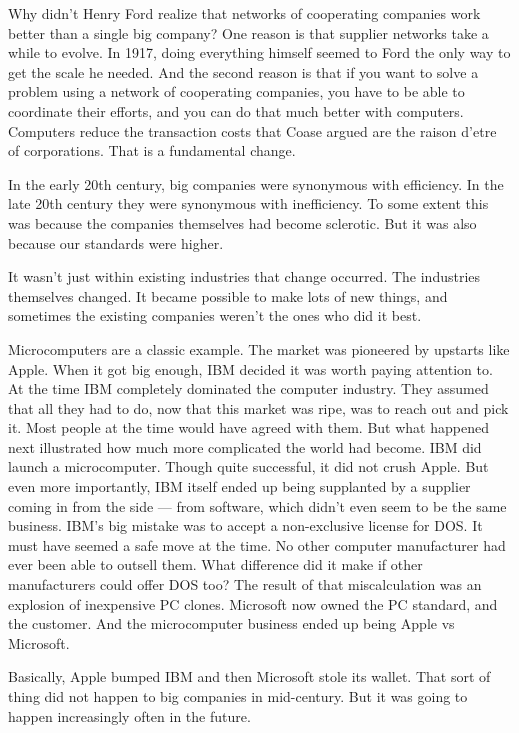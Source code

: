 \documentclass[12pt]{book}
\begin{document}
Why didn't Henry Ford realize that networks of cooperating companies
work better than a single big company? One reason is that supplier
networks take a while to evolve. In 1917, doing everything himself
seemed to Ford the only way to get the scale he needed. And the second
reason is that if you want to solve a problem using a network of
cooperating companies, you have to be able to coordinate their efforts,
and you can do that much better with computers. Computers reduce the
transaction costs that Coase argued are the raison d'etre of
corporations. That is a fundamental change.

In the early 20th century, big companies were synonymous with
efficiency. In the late 20th century they were synonymous with
inefficiency. To some extent this was because the companies themselves
had become sclerotic. But it was also because our standards were higher.

It wasn't just within existing industries that change occurred. The
industries themselves changed. It became possible to make lots of new
things, and sometimes the existing companies weren't the ones who did it
best.

Microcomputers are a classic example. The market was pioneered by
upstarts like Apple. When it got big enough, IBM decided it was worth
paying attention to. At the time IBM completely dominated the computer
industry. They assumed that all they had to do, now that this market was
ripe, was to reach out and pick it. Most people at the time would have
agreed with them. But what happened next illustrated how much more
complicated the world had become. IBM did launch a microcomputer. Though
quite successful, it did not crush Apple. But even more importantly, IBM
itself ended up being supplanted by a supplier coming in from the side
--- from software, which didn't even seem to be the same business. IBM's
big mistake was to accept a non-exclusive license for DOS. It must have
seemed a safe move at the time. No other computer manufacturer had ever
been able to outsell them. What difference did it make if other
manufacturers could offer DOS too? The result of that miscalculation was
an explosion of inexpensive PC clones. Microsoft now owned the PC
standard, and the customer. And the microcomputer business ended up
being Apple vs Microsoft.

Basically, Apple bumped IBM and then Microsoft stole its wallet. That
sort of thing did not happen to big companies in mid-century. But it was
going to happen increasingly often in the future.
\end{document}
